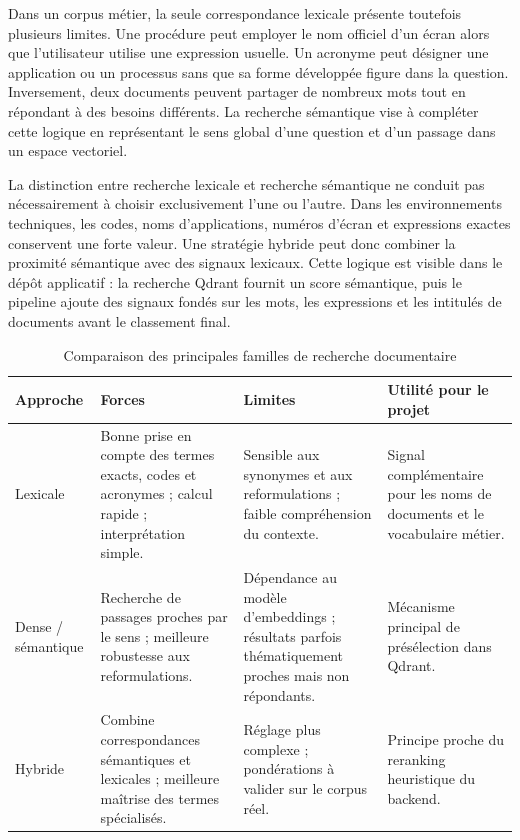 Dans un corpus métier, la seule correspondance lexicale présente toutefois plusieurs limites. Une procédure peut employer le nom officiel d'un écran alors que l'utilisateur utilise une expression usuelle. Un acronyme peut désigner une application ou un processus sans que sa forme développée figure dans la question. Inversement, deux documents peuvent partager de nombreux mots tout en répondant à des besoins différents. La recherche sémantique vise à compléter cette logique en représentant le sens global d'une question et d'un passage dans un espace vectoriel.

La distinction entre recherche lexicale et recherche sémantique ne conduit pas nécessairement à choisir exclusivement l'une ou l'autre. Dans les environnements techniques, les codes, noms d'applications, numéros d'écran et expressions exactes conservent une forte valeur. Une stratégie hybride peut donc combiner la proximité sémantique avec des signaux lexicaux. Cette logique est visible dans le dépôt applicatif : la recherche Qdrant fournit un score sémantique, puis le pipeline ajoute des signaux fondés sur les mots, les expressions et les intitulés de documents avant le classement final.

\begin{table}[H]
\centering
\caption{Comparaison des principales familles de recherche documentaire}
\label{tab:recherche_familles}
\begin{tabular}{p{3cm}p{4cm}p{4cm}p{3.5cm}}
\toprule
\textbf{Approche} & \textbf{Forces} & \textbf{Limites} & \textbf{Utilité pour le projet} \\
\midrule
Lexicale & Bonne prise en compte des termes exacts, codes et acronymes ; calcul rapide ; interprétation simple. & Sensible aux synonymes et aux reformulations ; faible compréhension du contexte. & Signal complémentaire pour les noms de documents et le vocabulaire métier. \\
Dense / sémantique & Recherche de passages proches par le sens ; meilleure robustesse aux reformulations. & Dépendance au modèle d'embeddings ; résultats parfois thématiquement proches mais non répondants. & Mécanisme principal de présélection dans Qdrant. \\
Hybride & Combine correspondances sémantiques et lexicales ; meilleure maîtrise des termes spécialisés. & Réglage plus complexe ; pondérations à valider sur le corpus réel. & Principe proche du reranking heuristique du backend. \\
\bottomrule
\end{tabular}
\end{table}

